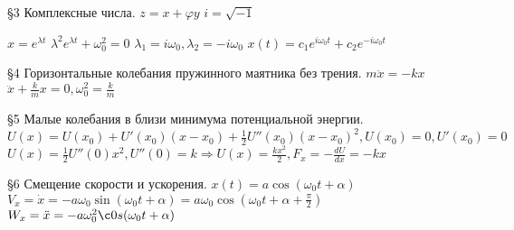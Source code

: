 \documentclass[12pt]{article}
\begin{document}
    \S3 Комплексные числа. \newline
    $z = x + \varphi y$ \newline
    $i = \sqrt{-1}$ \newline

    $x = e^{\lambda t}$ \newline
    $\lambda^2 e^{\lambda t} + \omega_0^2 = 0$ \newline
    $\lambda_1 = i\omega_0, \lambda_2 = -i \omega_0$ \newline
    $x(t) = c_1e^{i\omega_0t} + c_2e^{-i\omega_0t}$ \newline

    \S4 Горизонтальные колебания пружинного маятника без трения. \newline
    $m\ddot x = -kx$ \newline
    $\ddot x + \frac{k}mx = 0, \omega_0^2 = \frac{k}m$ \newline

    \S5 Малые колебания в близи минимума потенциальной энергии. \newline
    $U(x) = U(x_0) + U'(x_0)(x-x_0) + \frac12U''(x_0)(x-x_0)^2, U(x_0) = 0, U'(x_0) = 0$ \newline
    $U(x) = \frac12 U''(0)x^2, U''(0) = k \Rightarrow U(x) = \frac{kx^2}2, F_x = -\frac{dU}{dx} = -kx$ \newline

    \S6 Смещение скорости и ускорения. \newline
    $x(t) = a \cos (\omega_0t + \alpha)$ \newline
    $V_x = \dot x = -a \omega_0 \sin(\omega_0t + \alpha) = a\omega_0\cos(\omega_0t + \alpha+ \frac{\pi}2)$ \newline
    $W_x = \ddot x = -a \omega_0^2 \c0s(\omega_0t + \alpha)$ \newline
    
\end{document}
